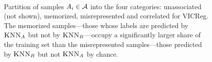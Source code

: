 \begin{figure}[ht]
\begin{minipage}[t]{0.49\textwidth}
\begin{subfigure}[b]{0.48\textwidth}
         \label{fig:per sample v. n}
     \end{subfigure}~
     \vspace{-0.5em}
    \caption{
    Partition of samples $A_i \in \mathcal{A}$ into the four categories: {\color{gray}unassociated} (not shown), {\color{part_orange}memorized}, {\color{part_red}misrepresented} and {\color{part_blue}correlated} for VICReg. The {\color{part_orange}memorized} samples---those whose labels are predicted by $\textsc{KNN}_A$ but not by $\textsc{KNN}_B$---occupy a significantly larger share of the training set than the {\color{part_red}misrepresented} samples---those predicted by $\textsc{KNN}_B$ but not $\textsc{KNN}_A$ by chance. %
    }
    \label{fig:partition attack main}
    \end{minipage}
\vspace{-1em} 
\end{figure}

\iffalse

